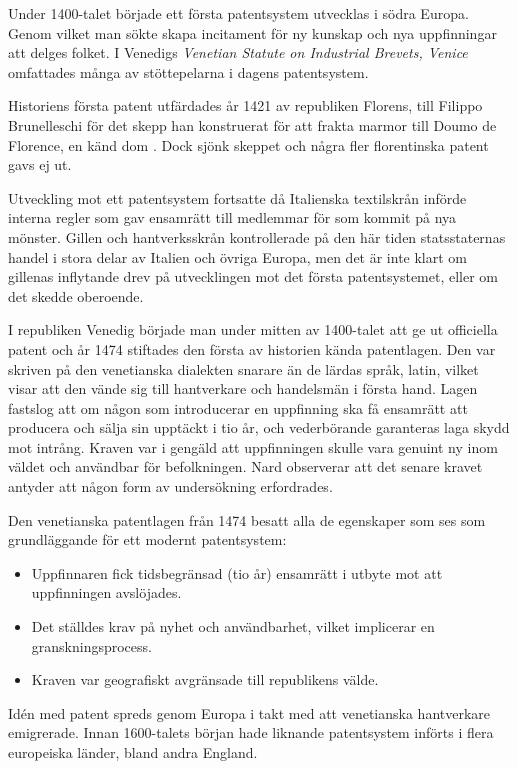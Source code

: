 Under 1400-talet började ett första patentsystem utvecklas i södra Europa.
Genom vilket man sökte skapa incitament för ny kunskap och nya uppfinningar att delges folket. 
I Venedigs \emph{Venetian Statute on Industrial Brevets, Venice} omfattades många av stöttepelarna i dagens patentsystem\cite{nard}.


Historiens första patent utfärdades år 1421 av republiken Florens, till Filippo Brunelleschi för det skepp han konstruerat för att frakta marmor till Doumo de Florence, en känd dom \cite{frumkin}. 
Dock sjönk skeppet och några fler florentinska patent gavs ej ut.

Utveckling mot ett patentsystem fortsatte då Italienska textilskrån införde interna regler som gav ensamrätt till medlemmar för som kommit på nya mönster.
Gillen och hantverksskrån kontrollerade på den här tiden statsstaternas handel i stora delar av Italien och övriga Europa, men det är inte klart om gillenas inflytande drev på utvecklingen mot det första patentsystemet, eller om det skedde oberoende.

I republiken Venedig började man under mitten av 1400-talet att ge ut officiella patent och år 1474 stiftades den första av historien kända patentlagen\cite{frumkin}.
Den var skriven på den venetianska dialekten snarare än de lärdas språk, latin, vilket visar att den vände sig till hantverkare och handelsmän i första hand.
Lagen fastslog att om någon som introducerar en uppfinning ska få ensamrätt att producera och sälja sin upptäckt i tio år, och vederbörande garanteras laga skydd mot intrång. 
Kraven var i gengäld att uppfinningen skulle vara genuint ny inom väldet och användbar för befolkningen. 
Nard observerar att det senare kravet antyder att någon form av undersökning erfordrades\cite{nard}. 

Den venetianska patentlagen från 1474 besatt alla de egenskaper som ses som grundläggande för ett modernt patentsystem\cite{nard}:

\begin{itemize}
    \item Uppfinnaren fick tidsbegränsad (tio år) ensamrätt i utbyte mot att uppfinningen avslöjades.
    \item Det ställdes krav på nyhet och användbarhet, vilket implicerar en granskningsprocess.
    \item Kraven var geografiskt avgränsade till republikens välde.
\end{itemize}

Idén med patent spreds genom Europa i takt med att venetianska hantverkare emigrerade. 
Innan 1600-talets början hade liknande patentsystem införts i flera europeiska länder, bland andra England.
